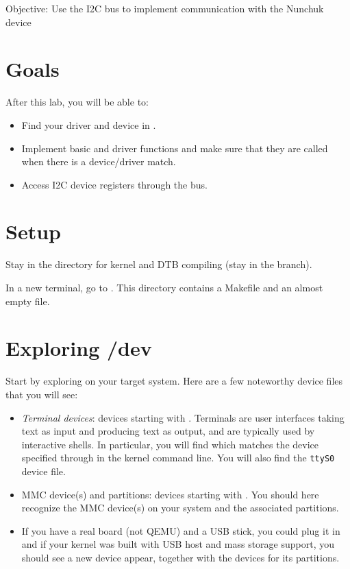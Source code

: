 {Objective: Use the I2C bus to implement communication with the Nunchuk device}

\section{Goals}

After this lab, you will be able to:
\begin{itemize}
\item Find your driver and device in .
\item Implement basic  and  driver
  functions and make sure that they are called when there is a
  device/driver match.
\item Access I2C device registers through the bus.
\end{itemize}

\section{Setup}

Stay in the  directory for kernel and DTB
compiling (stay in the  branch).

In a new terminal, go to
.  This directory
contains a Makefile and an almost empty  file.

\section{Exploring /dev}

Start by exploring  on your target system. Here are a few
noteworthy device files that you will see:

\begin{itemize}
 \item {\em Terminal devices}: devices starting with .
       Terminals are user interfaces taking text as
       input and producing text as output, and are typically used by
       interactive shells. In particular, you will find
        which matches the device specified through
        in the kernel command line. You will also find
       the {\tt ttyS0} device file.
 \item {MMC device(s) and partitions}: devices starting with
       . You should here recognize the MMC device(s)
       on your system and the associated partitions.
 \item If you have a real board (not QEMU) and a USB stick, you could
       plug it in and if your kernel was built with USB host and mass
       storage support, you should see a new  device appear,
       together with the  devices for its partitions.
\end{itemize}

